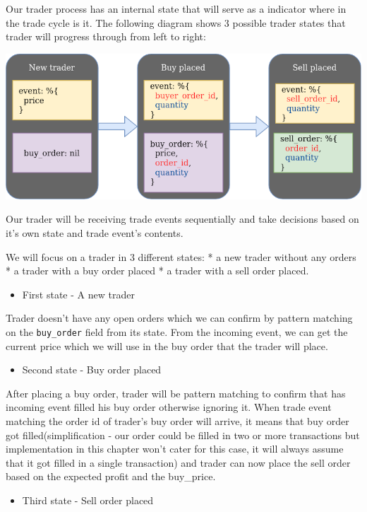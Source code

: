 \documentclass[
  oneside]{book}
\providecommand{\tightlist}{%
  \setlength{\itemsep}{0pt}\setlength{\parskip}{0pt}}
\begin{document}
Our trader process has an internal state that will serve as a indicator where in the trade cycle is it. The following diagram shows 3 possible trader states that trader will progress through from left to right:

\includegraphics{images/chapter_02_01_trader_states.png}

Our trader will be receiving trade events sequentially and take decisions
based on it's own state and trade event's contents.

We will focus on a trader in 3 different states:
* a new trader without any orders
* a trader with a buy order placed
* a trader with a sell order placed.

\begin{itemize}
\tightlist
\item
  First state - A new trader
\end{itemize}

Trader doesn't have any open orders which we can confirm by pattern matching on the \texttt{buy\_order} field from its state. From the incoming event, we can get
the current price which we will use in the buy order that the trader will place.

\begin{itemize}
\tightlist
\item
  Second state - Buy order placed
\end{itemize}

After placing a buy order, trader will be pattern matching to confirm that
has incoming event filled his buy order otherwise ignoring it.
When trade event matching the order id of trader's buy order will arrive, it means that buy order got filled(simplification - our order could be filled in two or more transactions but implementation in this chapter won't cater for this case, it will always assume that it got filled in a single transaction) and trader can now place the sell order based on the expected profit and the buy\_price.

\begin{itemize}
\tightlist
\item
  Third state - Sell order placed
\end{itemize}
\end{document}
